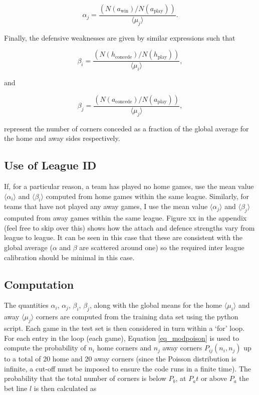 \documentclass[10pt]{article}
\begin{document}
\begin{equation}
\label{eq_attack_away}
\alpha_j = \frac{\left( N(a_\mathrm{win}) / N(a_\mathrm{play}) \right) }{\langle \mu_j \rangle }.
\end{equation}


Finally, the defensive weaknesses are given by similar expressions such that

\begin{equation}
\label{eq_defend_home}
\beta_i = \frac{\left( N(h_\mathrm{concede}) / N(h_\mathrm{play}) \right) }{\langle \mu_i \rangle },
\end{equation}

\noindent and

\begin{equation}
\label{eq_defend_home}
\beta_j = \frac{\left( N(a_\mathrm{concede}) / N(a_\mathrm{play}) \right) }{\langle \mu_j \rangle },
\end{equation}

\noindent represent the number of corners conceded as a fraction of the global average for the home and away sides respectively.

\subsection{Use of League ID}
If, for a particular reason, a team has played no home games, use the mean value $\langle \alpha_i \rangle$ and $\langle \beta_i \rangle$ computed from home games within the same league. Similarly, for teams that have not played any away games, I use the mean value $\langle \alpha_j \rangle$ and $\langle \beta_j \rangle$ computed from away games within the same league. Figure xx in the appendix (feel free to skip over this) shows how the attach and defence strengths vary from league to league. It can be seen in this case that these are consistent with the global average ($\alpha$ and $\beta$ are scattered around one) so the required inter league calibration should be minimal in this case.


\subsection{Computation}
The quantities $\alpha_i$, $\alpha_j$, $\beta_i$, $\beta_j$, along with the global means for the home $\langle \mu_i \rangle$ and away $\langle \mu_j \rangle$ corners are computed from the training data set using the python script. Each game in the test set is then considered in turn within a `for' loop.  For each entry in the loop (each game), Equation \ref{eq_modpoison} is used to compute the probability of $n_i$ home corners and $n_j$ away corners $P_{ij}(n_i,n_j)$ up to a total of 20 home and 20 away corners (since the Poisson distribution is infinite, a cut-off must be imposed to ensure the code runs in a finite time). The probability that the total number of corners is below $P_b$, at $P_at$ or above $P_a$ the bet line $l$ is then calculated as 
\end{document}
